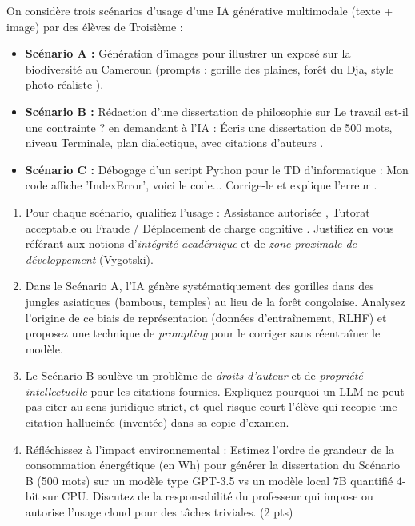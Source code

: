 \documentclass[11pt]{article}
\begin{document}
\begin{exercice}
On considère trois scénarios d'usage d'une IA générative multimodale (texte + image) par des élèves de Troisième :
\begin{itemize}
    \item \textbf{Scénario A :} Génération d'images pour illustrer un exposé sur \og la biodiversité au Cameroun \fg{} (prompts : \og gorille des plaines, forêt du Dja, style photo réaliste \fg{}).
    \item \textbf{Scénario B :} Rédaction d'une dissertation de philosophie sur \og Le travail est-il une contrainte ? \fg{} en demandant à l'IA : \og Écris une dissertation de 500 mots, niveau Terminale, plan dialectique, avec citations d'auteurs \fg{}.
    \item \textbf{Scénario C :} Débogage d'un script Python pour le TD d'informatique : \og Mon code affiche 'IndexError', voici le code... Corrige-le et explique l'erreur \fg{}.
\end{itemize}
\begin{enumerate}
    \item Pour chaque scénario, qualifiez l'usage : \og Assistance autorisée \fg{}, \og Tutorat acceptable \fg{} ou \og Fraude / Déplacement de charge cognitive \fg{}. Justifiez en vous référant aux notions d'\textit{intégrité académique} et de \textit{zone proximale de développement} (Vygotski).
    \item Dans le Scénario A, l'IA génère systématiquement des gorilles dans des jungles asiatiques (bambous, temples) au lieu de la forêt congolaise. Analysez l'origine de ce biais de représentation (données d'entraînement, RLHF) et proposez une technique de \textit{prompting} pour le corriger sans réentraîner le modèle.
    \item Le Scénario B soulève un problème de \textit{droits d'auteur} et de \textit{propriété intellectuelle} pour les citations fournies. Expliquez pourquoi un LLM ne peut pas \og citer \fg{} au sens juridique strict, et quel risque court l'élève qui recopie une citation hallucinée (inventée) dans sa copie d'examen.
    \item Réfléchissez à l'impact environnemental : Estimez l'ordre de grandeur de la consommation énergétique (en Wh) pour générer la dissertation du Scénario B (500 mots) sur un modèle type GPT-3.5 vs un modèle local 7B quantifié 4-bit sur CPU. Discutez de la responsabilité du professeur qui impose ou autorise l'usage cloud pour des tâches triviales. (2 pts)
\end{enumerate}
\end{exercice}
\end{document}
